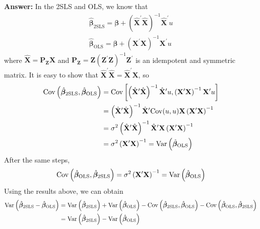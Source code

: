 \begin{enumerate}
\begin{enumerate}
        \textbf{Answer:} In the 2SLS and OLS, we know that
        \begin{gather*}
            \hat{\bm{\beta}}_{\mathrm{2SLS}} = \bm{\beta} + \left( \hat{\mathbf{X}}^\prime \hat{\mathbf{X}} \right)^{-1} \hat{\mathbf{X}}^\prime u \\
            \hat{\bm{\beta}}_{\mathrm{OLS}} = \bm{\beta} + \left( \mathbf{X}^\prime \mathbf{X} \right)^{-1} \mathbf{X}^\prime u
        \end{gather*}
        where $\hat{\mathbf{X}} = \mathbf{P}_{\mathbf{Z}} \mathbf{X}$ and $\mathbf{P}_{\mathbf{Z}} = \mathbf{Z}(\mathbf{Z}^\prime \mathbf{Z})^{-1} \mathbf{Z}^\prime$ is an idempotent and symmetric matrix. It is easy to show that $\hat{\mathbf{X}}^\prime \hat{\mathbf{X}} = \hat{\mathbf{X}}^\prime \mathbf{X}$, so
        \begin{align*}
            \mathrm{Cov}\left( \hat{\bm{\beta}}_{\mathrm{2SLS}}, \hat{\bm{\beta}}_{\mathrm{OLS}} \right) &= \mathrm{Cov}\left[ \left( \hat{\mathbf{X}}^\prime \hat{\mathbf{X}} \right)^{-1} \hat{\mathbf{X}}^\prime u, \left( \mathbf{X}^\prime \mathbf{X} \right)^{-1} \mathbf{X}^\prime u \right] \\
            &= \left( \hat{\mathbf{X}}^\prime \hat{\mathbf{X}} \right)^{-1} \hat{\mathbf{X}}^\prime \mathrm{Cov}(u,u) \mathbf{X} \left( \mathbf{X}^\prime \mathbf{X} \right)^{-1} \\
            &= \sigma^2 \left( \hat{\mathbf{X}}^\prime \hat{\mathbf{X}} \right)^{-1} \hat{\mathbf{X}}^\prime \mathbf{X} \left( \mathbf{X}^\prime \mathbf{X} \right)^{-1} \\
            &= \sigma^2 \left( \mathbf{X}^\prime \mathbf{X} \right)^{-1} = \mathrm{Var}\left( \hat{\bm{\beta}}_{\mathrm{OLS}} \right)
        \end{align*}
        After the same steps, 
        \[ \mathrm{Cov}\left( \hat{\bm{\beta}}_{\mathrm{OLS}}, \hat{\bm{\beta}}_{\mathrm{2SLS}} \right) = \sigma^2 \left( \mathbf{X}^\prime \mathbf{X} \right)^{-1} = \mathrm{Var}\left( \hat{\bm{\beta}}_{\mathrm{OLS}} \right) \]
        Using the results above, we can obtain
        \begin{align*}
            \mathrm{Var}\left( \hat{\bm{\beta}}_{\mathrm{2SLS}} - \hat{\bm{\beta}}_{\mathrm{OLS}} \right) &= \mathrm{Var}\left( \hat{\bm{\beta}}_{\mathrm{2SLS}} \right) + \mathrm{Var}\left( \hat{\bm{\beta}}_{\mathrm{OLS}} \right) - \mathrm{Cov}\left( \hat{\bm{\beta}}_{\mathrm{2SLS}}, \hat{\bm{\beta}}_{\mathrm{OLS}} \right) - \mathrm{Cov}\left( \hat{\bm{\beta}}_{\mathrm{OLS}}, \hat{\bm{\beta}}_{\mathrm{2SLS}} \right) \\
            &= \mathrm{Var}\left( \hat{\bm{\beta}}_{\mathrm{2SLS}} \right) - \mathrm{Var}\left( \hat{\bm{\beta}}_{\mathrm{OLS}} \right)
        \end{align*}
        

\end{enumerate}
\end{enumerate}

